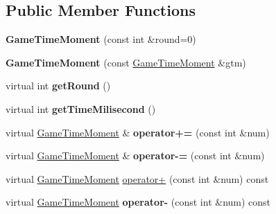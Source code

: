 \subsection*{Public Member Functions}
\begin{DoxyCompactItemize}
\item 
{\bfseries Game\+Time\+Moment} (const int \&round=0)\hypertarget{class_game_time_moment_a23c0d60569ba7a2b3fbe6c028eeb7a04}{}\label{class_game_time_moment_a23c0d60569ba7a2b3fbe6c028eeb7a04}

\item 
{\bfseries Game\+Time\+Moment} (const \hyperlink{class_game_time_moment}{Game\+Time\+Moment} \&gtm)\hypertarget{class_game_time_moment_a2d3d9de7fa76d90d21f37681aae63fdf}{}\label{class_game_time_moment_a2d3d9de7fa76d90d21f37681aae63fdf}

\item 
virtual int {\bfseries get\+Round} ()\hypertarget{class_game_time_moment_a824a4d9b801efdb8fe089f427de4ef4e}{}\label{class_game_time_moment_a824a4d9b801efdb8fe089f427de4ef4e}

\item 
virtual int {\bfseries get\+Time\+Milisecond} ()\hypertarget{class_game_time_moment_af7d26a223379c4cf5c0ce22cc18520eb}{}\label{class_game_time_moment_af7d26a223379c4cf5c0ce22cc18520eb}

\item 
virtual \hyperlink{class_game_time_moment}{Game\+Time\+Moment} \& {\bfseries operator+=} (const int \&num)\hypertarget{class_game_time_moment_a6a330ec3f886efb4221378a93e435ba2}{}\label{class_game_time_moment_a6a330ec3f886efb4221378a93e435ba2}

\item 
virtual \hyperlink{class_game_time_moment}{Game\+Time\+Moment} \& {\bfseries operator-\/=} (const int \&num)\hypertarget{class_game_time_moment_a61862641619c2e08c8f4d022811b1c78}{}\label{class_game_time_moment_a61862641619c2e08c8f4d022811b1c78}

\item 
virtual \hyperlink{class_game_time_moment}{Game\+Time\+Moment} \hyperlink{class_game_time_moment_af3f3350966ff440d93292acac5509a84}{operator+} (const int \&num) const 
\item 
virtual \hyperlink{class_game_time_moment}{Game\+Time\+Moment} {\bfseries operator-\/} (const int \&num) const \hypertarget{class_game_time_moment_a9d919e9bd2d17dd4341586f83939896f}{}\label{class_game_time_moment_a9d919e9bd2d17dd4341586f83939896f}


\end{DoxyCompactItemize}
